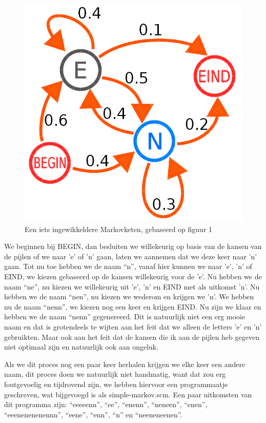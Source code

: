 \documentclass{article}
\begin{document}
\begin{figure}
  \includegraphics[width=0.9\linewidth]{markovketens2.png} 
  \caption{Een iets ingewikkeldere Markovketen, gebaseerd op figuur 1\cite{markovketen2}}
  \label{fig:markovketens2}
\end{figure}

We beginnen bij BEGIN, dan besluiten we willekeurig op basis van de kansen van de pijlen of we naar 'e' of 'n' gaan, laten we aannemen dat we deze keer naar 'n' gaan. Tot nu toe hebben we de naam “n”, vanaf hier kunnen we naar 'e', 'n' of EIND, we kiezen gebaseerd op de kansen willekeurig voor de 'e'. Nu hebben we de naam “ne”, nu kiezen we willekeurig uit 'e', 'n' en EIND met als uitkomst 'n'. Nu hebben we de naam “nen”, nu kiezen we wederom en krijgen we 'n'. We hebben nu de naam “nenn”, we kiezen nog een keer en krijgen EIND. Nu zijn we klaar en hebben we de naam “nenn” gegenereerd. Dit is natuurlijk niet een erg mooie naam en dat is grotendeels te wijten aan het feit dat we alleen de letters 'e' en 'n' gebruikten. Maar ook aan het feit dat de kansen die ik aan de pijlen heb gegeven niet optimaal zijn en natuurlijk ook aan ongeluk.

Als we dit proces nog een paar keer herhalen krijgen we elke keer een andere naam, dit proces doen we natuurlijk niet handmatig, want dat zou erg foutgevoelig en tijdrovend zijn, we hebben hiervoor een programmaatje geschreven, wat bijgevoegd is als simple-markov.scm. Een paar uitkomsten van dit programma zijn: “eeeeenn”, “ee”, “enenn”, “neneen”, “enen”, “eeenenenenennn”, “eene”, “enn”, “n” en “neeneneenen”.
\end{document}
